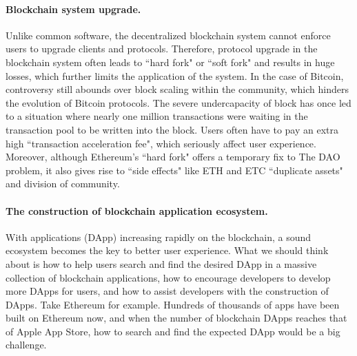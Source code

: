 \paragraph{Blockchain system upgrade.} Unlike common software, the decentralized blockchain system cannot enforce users to upgrade clients and protocols. Therefore, protocol upgrade in the blockchain system often leads to 	``hard fork" or ``soft fork" and results in huge losses, which further limits the application of the system. In the case of Bitcoin, controversy still abounds over block scaling within the community, which hinders the evolution of Bitcoin protocols. The severe undercapacity of block has once led to a situation where nearly one million transactions were waiting in the transaction pool to be written into the block. Users often have to pay an extra high ``transaction acceleration fee", which seriously affect user experience. Moreover, although Ethereum's ``hard fork" offers a temporary fix to The DAO problem, it also gives rise to ``side effects" like ETH and ETC ``duplicate assets" and division of community.

\paragraph{The construction of blockchain application ecosystem.} With applications (DApp) increasing rapidly on the blockchain, a sound ecosystem becomes the key to better user experience. What we should think about is how to help users search and find the desired DApp in a massive collection of blockchain applications, how to encourage developers to develop more DApps for users, and how to assist developers with the construction of DApps. Take Ethereum for example. Hundreds of thousands of apps have been built on Ethereum now, and when the number of blockchain DApps reaches that of Apple App Store, how to search and find the expected DApp would be a big challenge.


